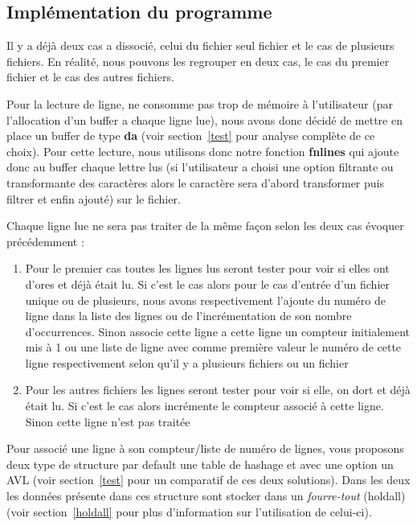 \documentclass[12pt]{article}
\begin{document}
    \subsection{Implémentation du programme}
    Il y a déjà deux cas a dissocié, celui du fichier seul fichier et le cas de 
    plusieurs fichiers. En réalité, nous pouvons les regrouper en deux 
    cas, le cas du premier fichier et le cas des autres fichiers.

    Pour la lecture de ligne, ne consomme pas trop de mémoire à l'utilisateur
    (par l'allocation d'un buffer a chaque ligne lue), nous avons donc décidé de 
    mettre en place un buffer de type \textbf{da} (voir section~\ref{test} pour
    analyse complète de ce choix). Pour cette lecture, nous utilisons donc notre
    fonction \textbf{fnlines} qui ajoute donc au buffer chaque lettre lus (si 
    l'utilisateur a choisi une option filtrante ou transformante des caractères 
    alors le caractère sera d'abord transformer puis filtrer et enfin ajouté) 
    sur le fichier.

    Chaque ligne lue ne sera pas traiter de la même façon selon les deux cas 
    évoquer précédemment :

    \begin{enumerate}
        \item[] Pour le premier cas toutes les lignes lus seront tester pour 
        voir si elles ont d'ores et déjà était lu. Si c'est le cas alors pour le 
        cas d'entrée d'un fichier unique ou de plusieurs, nous avons 
        respectivement l'ajoute du numéro de ligne dans la liste des lignes ou 
        de l'incrémentation de son nombre d'occurrences. Sinon associe cette ligne 
        a cette ligne un compteur initialement mis à 1 ou une liste de ligne 
        avec comme première valeur le numéro de cette ligne respectivement selon 
        qu'il y a plusieurs fichiers ou un fichier
        \item[] Pour les autres fichiers les lignes seront tester pour voir si 
        elle, on dort et déjà était lu. Si c'est le cas alors incrémente le 
        compteur associé à cette ligne. Sinon cette ligne n'est pas traitée
    \end{enumerate}

    Pour associé une ligne à son compteur/liste de numéro de lignes, vous 
    proposons deux type de structure par default une table de hashage et avec 
    une option un AVL (voir section~\ref{test} pour un comparatif de ces deux 
    solutions). Dans les deux les données présente dans ces structure sont 
    stocker dans un \textit{fourre-tout} (holdall) (voir section~\ref{holdall} 
    pour plus d'information sur l'utilisation de celui-ci).
\end{document}
